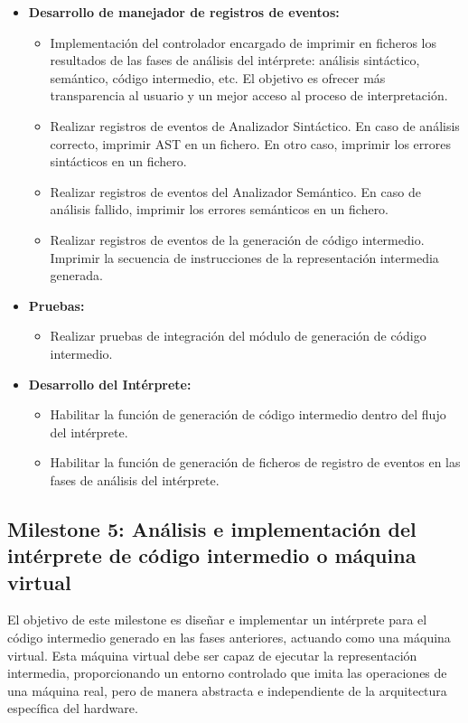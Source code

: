 \begin{itemize}
    \item \textbf{Desarrollo de manejador de registros de eventos:}
    \begin{itemize}
        \item Implementación del controlador encargado de imprimir en ficheros los resultados de las fases de análisis del intérprete: análisis sintáctico, semántico, código intermedio, etc. El objetivo es ofrecer más transparencia al usuario y un mejor acceso al proceso de interpretación.
        \item Realizar registros de eventos de Analizador Sintáctico. En caso de análisis correcto, imprimir AST en un fichero. En otro caso, imprimir los errores sintácticos en un fichero.
        \item Realizar registros de eventos del Analizador Semántico. En caso de análisis fallido, imprimir los errores semánticos en un fichero.
        \item Realizar registros de eventos de la generación de código intermedio. Imprimir la secuencia de instrucciones de la representación intermedia generada.
    \end{itemize}

    \item \textbf{Pruebas:}
    \begin{itemize}
        \item Realizar pruebas de integración del módulo de generación de código intermedio.
    \end{itemize}

    \item \textbf{Desarrollo del Intérprete:}
    \begin{itemize}
        \item Habilitar la función de generación de código intermedio dentro del flujo del intérprete.
        \item Habilitar la función de generación de ficheros de registro de eventos en las fases de análisis del intérprete.
    \end{itemize}
\end{itemize}

\subsection{Milestone 5: Análisis e implementación del intérprete de código intermedio o máquina virtual}
El objetivo de este milestone es diseñar e implementar un intérprete para el código intermedio generado en las fases anteriores, actuando como una máquina virtual. Esta máquina virtual debe ser capaz de ejecutar la representación intermedia, proporcionando un entorno controlado que imita las operaciones de una máquina real, pero de manera abstracta e independiente de la arquitectura específica del hardware.

